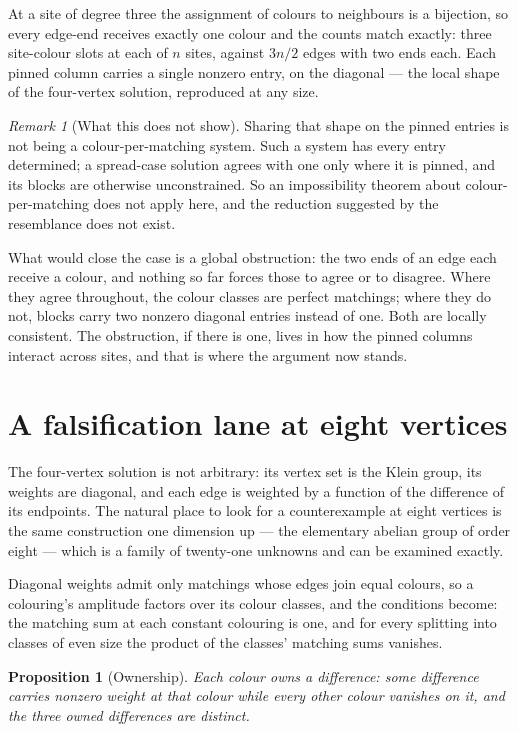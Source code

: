 \documentclass[11pt]{article}
\newtheorem{proposition}[theorem]{Proposition}
\theoremstyle{definition}
\theoremstyle{remark}
\newtheorem{remark}[theorem]{Remark}
\begin{document}
At a site of degree three the assignment of colours to neighbours is a bijection, so every
edge-end receives exactly one colour and the counts match exactly: three site-colour slots
at each of $n$ sites, against $3n/2$ edges with two ends each. Each pinned column carries a
single nonzero entry, on the diagonal --- the local shape of the four-vertex solution,
reproduced at any size.

\begin{remark}[What this does not show]
Sharing that shape on the pinned entries is not being a colour-per-matching system. Such a
system has every entry determined; a spread-case solution agrees with one only where it is
pinned, and its blocks are otherwise unconstrained. So an impossibility theorem about
colour-per-matching does not apply here, and the reduction suggested by the resemblance
does not exist.
\end{remark}

What would close the case is a global obstruction: the two ends of an edge each receive a
colour, and nothing so far forces those to agree or to disagree. Where they agree
throughout, the colour classes are perfect matchings; where they do not, blocks carry two
nonzero diagonal entries instead of one. Both are locally consistent. The obstruction, if
there is one, lives in how the pinned columns interact across sites, and that is where the
argument now stands.

\section{A falsification lane at eight vertices}\label{sec:falsify}

The four-vertex solution is not arbitrary: its vertex set is the Klein group, its
weights are diagonal, and each edge is weighted by a function of the difference of its
endpoints. The natural place to look for a counterexample at eight vertices is the same
construction one dimension up --- the elementary abelian group of order eight --- which
is a family of twenty-one unknowns and can be examined exactly.

Diagonal weights admit only matchings whose edges join equal colours, so a colouring's
amplitude factors over its colour classes, and the conditions become: the matching sum
at each constant colouring is one, and for every splitting into classes of even size the
product of the classes' matching sums vanishes.

\begin{proposition}[Ownership]
Each colour owns a difference: some difference carries nonzero weight at that colour
while every other colour vanishes on it, and the three owned differences are distinct.
\end{proposition}
\end{document}
